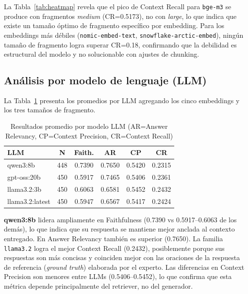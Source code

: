 \documentclass{article}
\begin{document}
La Tabla~\ref{tab:heatmap} revela que el pico de Context Recall para
\texttt{bge-m3} se produce con fragmentos \textit{medium} (CR=0.5173), no con
\textit{large}, lo que indica que existe un tamaño óptimo de fragmento
específico por embedding. Para los embeddings más débiles
(\texttt{nomic-embed-text}, \texttt{snowflake-arctic-embed}), ningún tamaño de
fragmento logra superar CR=0.18, confirmando que la debilidad es estructural del
modelo y no solucionable con ajustes de chunking.

\subsection{Análisis por modelo de lenguaje (LLM)}

La Tabla~\ref{tab:por_llm} presenta los promedios por LLM agregando los cinco
embeddings y los tres tamaños de fragmento.

\begin{table}[H]
\centering
\begin{tabular}{|l|c|c|c|c|c|}
\hline
\textbf{LLM} & \textbf{N} & \textbf{Faith.} & \textbf{AR} & \textbf{CP} & \textbf{CR} \\
\hline
qwen3:8b         & 448 & 0.7390 & 0.7650 & 0.5420 & 0.2315 \\
gpt-oss:20b      & 450 & 0.5917 & 0.7465 & 0.5406 & 0.2361 \\
llama3.2:3b      & 450 & 0.6063 & 0.6581 & 0.5452 & 0.2432 \\
llama3.2:latest  & 450 & 0.5947 & 0.6567 & 0.5417 & 0.2424 \\
\hline
\end{tabular}
\caption{Resultados promedio por modelo LLM (AR=Answer Relevancy, CP=Context Precision, CR=Context Recall)}
\label{tab:por_llm}
\end{table}

\textbf{qwen3:8b} lidera ampliamente en Faithfulness (0.7390 vs 0.5917--0.6063
de los demás), lo que indica que su respuesta se mantiene mejor anclada al
contexto entregado. En Answer Relevancy también es superior (0.7650). La
familia \texttt{llama3.2} logra el mejor Context Recall (0.2432), posiblemente
porque sus respuestas son más concisas y coinciden mejor con las oraciones
de la respuesta de referencia (\textit{ground truth}) elaborada por el experto. Las diferencias en Context Precision son
menores entre LLMs (0.5406--0.5452), lo que confirma que esta métrica depende
principalmente del retriever, no del generador.
\end{document}
